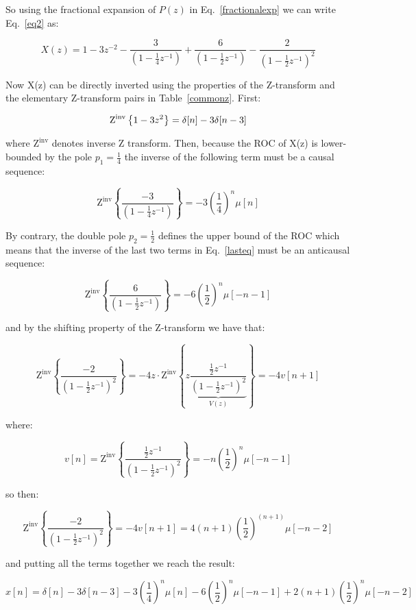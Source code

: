 \documentclass[a4paper,12pt,oneside]{article}
\begin{document}
So using the fractional expansion of $P(z)$ in Eq.~\ref{fractionalexp} we can write Eq.~\ref{eq2} as:


\begin{equation}\label{lasteq}
X(z)=1-3z^{-2}-\frac{3}{(1-\frac{1}{4}z^{-1})}+\frac{6}{(1-\frac{1}{2}z^{-1})}-\frac{2}{(1-\frac{1}{2}z^{-1})^2}
\end{equation}

Now X(z) can be directly inverted using the properties of the Z-transform and the elementary Z-transform pairs in Table~\ref{commonz}. First:

\[
\textrm{Z}^{\textrm{inv}}\left\{1-3z^{2}\right\}=\delta[n]-3\delta[n-3]\\
\]

where $\textrm{Z}^{\textrm{inv}}$ denotes inverse Z transform. Then, because the ROC of X(z) is lower-bounded by the pole $p_1=\frac{1}{4}$ the inverse of the following term must be a causal sequence:

\[
\textrm{Z}^{\textrm{inv}}\left\{\frac{-3}{(1-\frac{1}{4}z^{-1})}\right\}=-3\left(\frac{1}{4}\right)^n\mu[n]
\]

By contrary, the double pole $p_2=\frac{1}{2}$ defines the upper bound of the ROC which means that the inverse of the last two terms in Eq.~\ref{lasteq} must be an anticausal sequence:

\[
\textrm{Z}^{\textrm{inv}}\left\{\frac{6}{(1-\frac{1}{2}z^{-1})}\right\}=-6\left(\frac{1}{2}\right)^n\mu[-n-1]
\]

and by the shifting property of the Z-transform we have that:

\[
\textrm{Z}^{\textrm{inv}}\left\{\frac{-2}{(1-\frac{1}{2}z^{-1})^2}\right\}=-4 z\cdot \textrm{Z}^{\textrm{inv}}\left\{z\underbrace{\frac{\frac{1}{2}z^{-1}}{(1-\frac{1}{2}z^{-1})^2}}_{V(z)}\right\}=-4v[n+1]
\]

where:

\[
v[n] =  \textrm{Z}^{\textrm{inv}}\left\{\frac{\frac{1}{2}z^{-1}}{(1-\frac{1}{2}z^{-1})^2}\right\}=-n\left(\frac{1}{2}\right)^n\mu[-n-1]
\]

so then:

\[
\textrm{Z}^{\textrm{inv}}\left\{\frac{-2}{(1-\frac{1}{2}z^{-1})^2}\right\}=-4v[n+1]=4(n+1)\left(\frac{1}{2}\right)^{(n+1)}\mu[-n-2]
\]

and putting all the terms together we reach the result:

\[
x[n] =\delta[n]-3\delta[n-3]-3\left(\frac{1}{4}\right)^n\mu[n]-6\left(\frac{1}{2}\right)^n\mu[-n-1]+2(n+1)\left(\frac{1}{2}\right)^{n}\mu[-n-2]
\]
\end{document}
